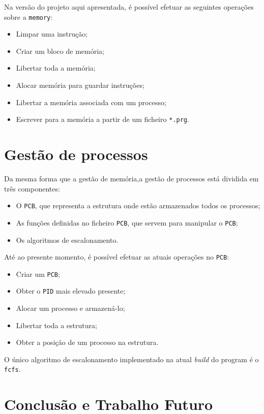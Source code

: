 \documentclass[a4paper,11pt,onecolumn,oneside]{article}
\begin{document}
	Na versão do projeto aqui apresentada, é possível efetuar as seguintes operações sobre a \verb|memory|:
	    \begin{itemize}
	        \item Limpar uma instrução;
	        \item Criar um bloco de memória;
	        \item Libertar toda a memória;
	        \item Alocar memória para guardar instruções;
	        \item Libertar a memória associada com um processo;
	        \item Escrever para a memória a partir de um ficheiro \verb|*.prg|.
	    \end{itemize}
	\section{Gestão de processos}
	\label{sec:process}
	Da mesma forma que a gestão de memória,a gestão de processos está dividida em três componentes:
	\begin{itemize} %
	    \item O \texttt{\ac{PCB}}, que representa a estrutura onde estão armazenados todos os processos;
	    \item As funções definidas no ficheiro \texttt{\ac{PCB}}, que servem para manipular o \texttt{\ac{PCB}};
	    \item Os algoritmos de escalonamento.
	\end{itemize}  
	
	Até ao presente momento, é possível efetuar as atuais operações no \texttt{\ac{PCB}}:
    
	\begin{itemize}
	    \item Criar um \texttt{\ac{PCB}};
	    \item Obter o \texttt{\ac{PID}} mais elevado presente;
	    \item Alocar um processo e armazená-lo;
	    \item Libertar toda a estrutura;
	    \item Obter a posição de um processo na estrutura.
	\end{itemize}
	
	O único algoritmo de escalonamento implementado na atual \textit{build} do program é o \texttt{\ac{fcfs}}.
	
	\section{Conclusão e Trabalho Futuro}
	\label{sec:con_futwork}
	
\end{document}
